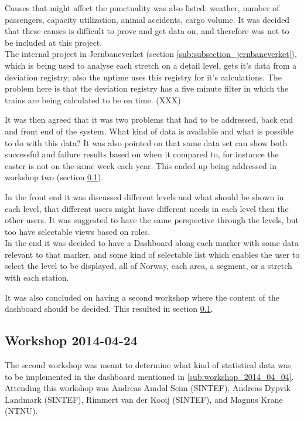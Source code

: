 Causes that might affect the punctuality was also listed: weather, number of
passengers, capacity utilization, animal accidents, cargo volume.
It was decided that these causes is difficult to prove and get data on, and
therefore was not to be included at this project.\\

The internal project in Jernbaneverket (section
\ref{sub:subsection_jernbaneverket}), which is being used to analyse each
stretch on a detail level, gets it's data from a deviation registry; also the
uptime uses this registry for it's calculations. The problem here is that the deviation registry has a five minute filter
in which the trains are being calculated to be on time. (XXX)

It was then agreed that it was two problems that had to be addressed, back end
and front end of the system. What kind of data is available and what is
possible to do with this data? It was also pointed on that same data set can 
show both successful and failure results based on when it compared to, for 
instance the easter is not on the same week each year. This ended up being 
addressed in workshop two (section \ref{sub:workshop_2014_04_24}). 

In the front end it was discussed different levels and what should be shown in
each level, that different users might have different needs in each level then
the other users. It was suggested to have the same perspective through the
levels, but too have selectable views based on roles. \\

In the end it was decided to have a Dashboard along each marker with some data
relevant to that marker, and some kind of selectable list which enables the
user to select the level to be displayed, all of Norway, each area, a segment,
or a stretch with each station. 

It was also concluded on having a second workshop where the content of the
dashboard should be decided. This resulted in section \ref{sub:workshop_2014_04_24}.


\subsection{Workshop 2014-04-24} %
\label{sub:workshop_2014_04_24}
The second workshop was meant to determine what kind of statistical data was 
to be implemented in the dashboard mentioned in \ref{sub:workshop_2014_04_04}.
Attending this workshop was Andreas Amdal Seim (SINTEF), Andreas Dypvik 
Landmark (SINTEF), Rimmert van der Kooij (SINTEF), and Magnus Krane (NTNU).\\

